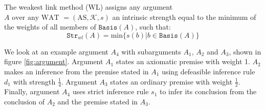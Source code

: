 \documentclass[runningheads]{llncs}
\newcommand{\K}{\mathcal{K}}
\newcommand{\Str}{\texttt{Str}}
\newcommand{\B}{\texttt{Basis}}
\begin{document}
\begin{definition}\label{WL}
The weakest link method (WL) assigns any argument $A \text{ over any WAT } = ( \text{AS}, \K, s )$ an intrinsic strength equal to the minimum of the weights of all members of $\B(A)$, such that: $$\Str_{wl}(A) = \text{min}\{s(b)|b\in\B(A)\}$$
\end{definition}

\begin{example}\label{Example_Argument}
We look at an example argument $A_4$ with subarguments $A_1$, $A_2$ and $A_3$, shown in figure \ref{fig:argument}. Argument $A_1$ states an axiomatic premise with weight 1. $A_2$ makes an inference from the premise stated in $A_1$ using defeasible inference rule $d_1$ with strength $\frac{1}{4}$. Argument $A_3$ states an ordinary premise with weight $\frac{1}{2}$. Finally, argument $A_4$ uses strict inference rule $s_1$ to infer its conclusion from the conclusion of $A_2$ and the premise stated in $A_3$.
\begin{figure}[ht]
    \centering
    
\end{figure}
\end{example}
\end{document}
